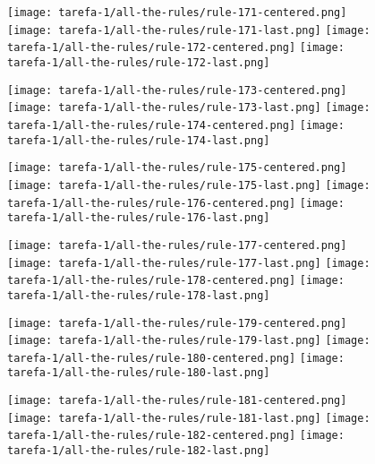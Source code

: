 \begin{figure}[htbp]
  \centering
\texttt{[image: tarefa-1/all-the-rules/rule-171-centered.png]}
\texttt{[image: tarefa-1/all-the-rules/rule-171-last.png]}
\texttt{[image: tarefa-1/all-the-rules/rule-172-centered.png]}
\texttt{[image: tarefa-1/all-the-rules/rule-172-last.png]}
\end{figure}
\begin{figure}[htbp]
  \centering
\texttt{[image: tarefa-1/all-the-rules/rule-173-centered.png]}
\texttt{[image: tarefa-1/all-the-rules/rule-173-last.png]}
\texttt{[image: tarefa-1/all-the-rules/rule-174-centered.png]}
\texttt{[image: tarefa-1/all-the-rules/rule-174-last.png]}
\end{figure}
\begin{figure}[htbp]
  \centering
\texttt{[image: tarefa-1/all-the-rules/rule-175-centered.png]}
\texttt{[image: tarefa-1/all-the-rules/rule-175-last.png]}
\texttt{[image: tarefa-1/all-the-rules/rule-176-centered.png]}
\texttt{[image: tarefa-1/all-the-rules/rule-176-last.png]}
\end{figure}
\begin{figure}[htbp]
  \centering
\texttt{[image: tarefa-1/all-the-rules/rule-177-centered.png]}
\texttt{[image: tarefa-1/all-the-rules/rule-177-last.png]}
\texttt{[image: tarefa-1/all-the-rules/rule-178-centered.png]}
\texttt{[image: tarefa-1/all-the-rules/rule-178-last.png]}
\end{figure}
\begin{figure}[htbp]
  \centering
\texttt{[image: tarefa-1/all-the-rules/rule-179-centered.png]}
\texttt{[image: tarefa-1/all-the-rules/rule-179-last.png]}
\texttt{[image: tarefa-1/all-the-rules/rule-180-centered.png]}
\texttt{[image: tarefa-1/all-the-rules/rule-180-last.png]}
\end{figure}
\begin{figure}[htbp]
  \centering
\texttt{[image: tarefa-1/all-the-rules/rule-181-centered.png]}
\texttt{[image: tarefa-1/all-the-rules/rule-181-last.png]}
\texttt{[image: tarefa-1/all-the-rules/rule-182-centered.png]}
\texttt{[image: tarefa-1/all-the-rules/rule-182-last.png]}
\end{figure}
